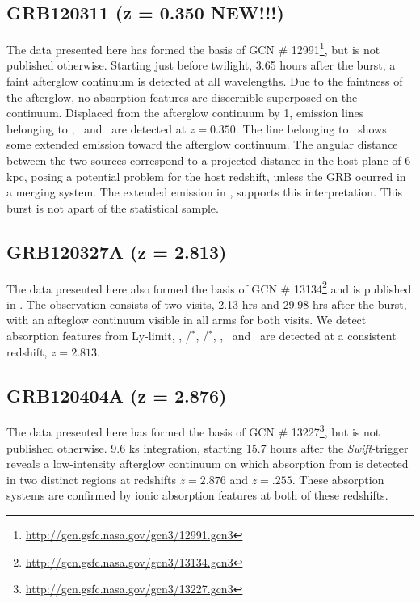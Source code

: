 \documentclass{aa}    %
\begin{document}
\subsection{GRB120311 (z = 0.350 NEW!!!)}
The data presented here has formed the basis of GCN \#
12991\footnote{\url{http://gcn.gsfc.nasa.gov/gcn3/12991.gcn3}}, but is not
published otherwise. Starting just before twilight, 3.65 hours after the burst,
a faint afterglow continuum is detected at all wavelengths. Due to the
faintness of the afterglow, no absorption features are discernible superposed
on the continuum. Displaced from the afterglow continuum by 1, emission
lines belonging to \hb, \oiii~and \ha~are detected at $z = 0.350$. The line
belonging to \ha~shows some extended emission toward the afterglow continuum.
The angular distance between the two sources correspond to a projected distance
in the host plane of 6 kpc, posing a potential problem for the host redshift,
unless the GRB ocurred in a merging system. The extended emission in \ha,
supports this interpretation. This burst is not apart of the statistical sample.

\subsection{GRB120327A (z = 2.813)}
The data presented here also formed the basis of GCN \#
13134\footnote{\url{http://gcn.gsfc.nasa.gov/gcn3/13134.gcn3}} and is published
in \citet{DElia2014}. The observation consists of two visits, 2.13 hrs and
29.98 hrs after the burst, with an afteglow continuum visible in all arms for
both visits. We detect absorption features from Ly-limit, \lya, \cii/\cii$^*$,
\SIii/\SIii$^*$, \ali, \feii ~and \mgii ~are detected at a consistent redshift,
$z = 2.813$.

\subsection{GRB120404A (z = 2.876)}
The data presented here has formed the basis of GCN \#
13227\footnote{\url{http://gcn.gsfc.nasa.gov/gcn3/13227.gcn3}}, but is not
published otherwise. 9.6 ks integration, starting 15.7 hours after the
\textit{Swift}-trigger reveals a low-intensity afterglow continuum on which
absorption from \lya is detected in two distinct regions at redshifts $z=2.876$
and $z=.255$. These absorption systems are confirmed by ionic absorption
features at both of these redshifts.
\end{document}
